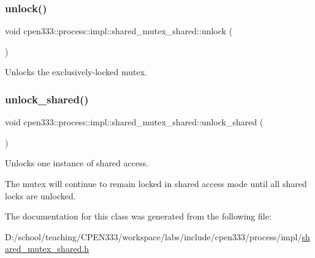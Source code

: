 \subsubsection{\texorpdfstring{unlock()}{unlock()}}
{\footnotesize\ttfamily void cpen333\+::process\+::impl\+::shared\+\_\+mutex\+\_\+shared\+::unlock (\begin{DoxyParamCaption}{ }\end{DoxyParamCaption})\hspace{0.3cm}{\ttfamily [inline]}}



Unlocks the exclusively-\/locked mutex. 

\mbox{\label{classcpen333_1_1process_1_1impl_1_1shared__mutex__shared_a4a7331e891ef08ffddda51ab5722fac6}} 
\subsubsection{\texorpdfstring{unlock\+\_\+shared()}{unlock\_shared()}}
{\footnotesize\ttfamily void cpen333\+::process\+::impl\+::shared\+\_\+mutex\+\_\+shared\+::unlock\+\_\+shared (\begin{DoxyParamCaption}{ }\end{DoxyParamCaption})\hspace{0.3cm}{\ttfamily [inline]}}



Unlocks one instance of shared access. 

The mutex will continue to remain locked in shared access mode until all shared locks are unlocked. 

The documentation for this class was generated from the following file\+:\begin{DoxyCompactItemize}
\item 
D\+:/school/teaching/\+C\+P\+E\+N333/workspace/labs/include/cpen333/process/impl/\hyperlink{process_2impl_2shared__mutex__shared_8h}{shared\+\_\+mutex\+\_\+shared.\+h}\end{DoxyCompactItemize}
